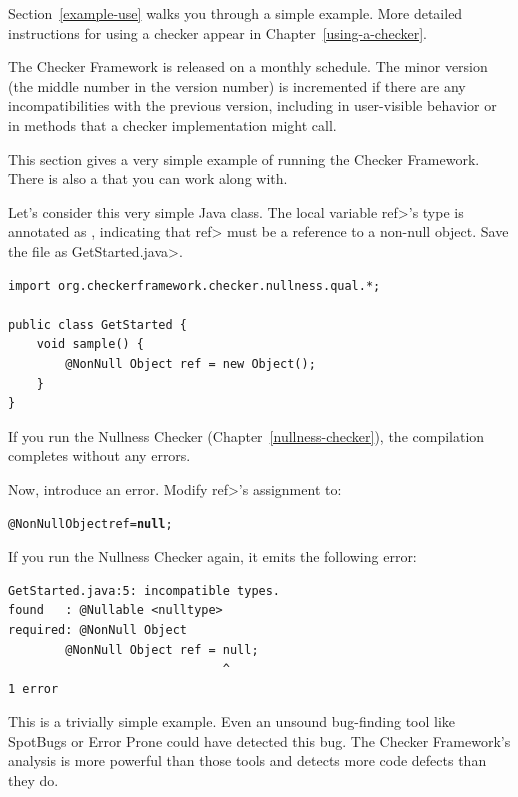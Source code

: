 Section~\ref{example-use} walks you through a simple example.  More detailed
instructions for using a checker appear in Chapter~\ref{using-a-checker}.

\label{version-number}
The Checker Framework is released on a monthly schedule.  The minor version
(the middle number in the version number) is incremented if there are any
incompatibilities
with the previous version, including in user-visible
behavior or in methods that a checker implementation might call.



This section gives a very simple example of running the Checker Framework.
There is also a 
that you can work along with.

  Let's consider this very simple Java class.  The local variable \<ref>'s type is
  annotated as , indicating that \<ref> must be a reference to a
  non-null object.  Save the file as \<GetStarted.java>.

\begin{Verbatim}
import org.checkerframework.checker.nullness.qual.*;

public class GetStarted {
    void sample() {
        @NonNull Object ref = new Object();
    }
}
\end{Verbatim}

If you run the Nullness Checker (Chapter~\ref{nullness-checker}), the
compilation completes without any errors.

Now, introduce an error.  Modify \<ref>'s assignment to:
\begin{alltt}
  @NonNull Object ref = \textbf{null};
\end{alltt}

If you run the Nullness Checker again, it emits
  the following error:
\begin{Verbatim}
GetStarted.java:5: incompatible types.
found   : @Nullable <nulltype>
required: @NonNull Object
        @NonNull Object ref = null;
                              ^
1 error
\end{Verbatim}

This is a trivially simple example.  Even an unsound bug-finding tool like
SpotBugs or Error Prone could have detected this bug.  The
Checker Framework's analysis is more powerful than those tools and detects
more code defects than they do.

